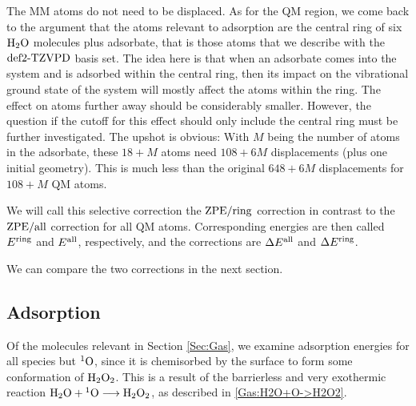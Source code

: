 The MM atoms do not need to be displaced. 
As for the QM region, we come back to the argument that the atoms relevant to
adsorption are the central ring of six $\text H _2 \text O$ molecules plus adsorbate, that is
those atoms that we describe with the $\text{def2-TZVPD}$ basis set. The idea here is that
when an adsorbate comes into the system and is adsorbed within the central
ring, then its impact on the vibrational ground state of the system will mostly
affect the atoms within the ring. The effect on atoms further away should be
considerably smaller. However, the question if the cutoff for this effect should
only include the central ring must be further investigated. The upshot is
obvious: With $M$ being the number of atoms in the adsorbate, these $18+M$
atoms need $108+6M$ displacements (plus one initial geometry). This is much
less than the original $648+6M$ displacements for \mbox{$108+M$} QM atoms.

We will call this selective correction the $\text{ZPE}/\text{ring}$ correction in contrast to
the $\text{ZPE}/\text{all}$ correction for all QM atoms. Corresponding energies are then called
$E^{\text{ring}}$ and $E^{\text{all}}$, respectively, and the corrections are $\Delta E^{\text{all}}$ and $\Delta E^{\text{ring}}$. 

We can compare the two corrections in the next section.



\subsection{Adsorption}
\label{Sec:Ads:Adsorption}
\newcommand\avg{\enmat{E_{\te {avg}}^{\te{ads}}}}
Of the molecules relevant in Section \ref{Sec:Gas}, we examine adsorption
energies for all species but ${^1\text{O}}$, since it is chemisorbed by the surface
to form some conformation of $\text H _2 \text O_2$. This is a result of the barrierless
and very exothermic reaction \mbox{$\text H _2 \text O+{^1\text{O}}\longrightarrow\text H _2 \text O_2$}, as described in
\eqref{Gas:H2O+O->H2O2}.

